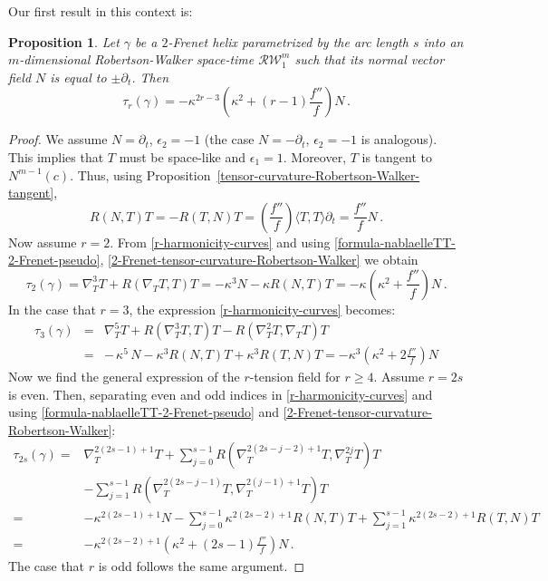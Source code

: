 \documentclass[11pt]{amsart}
\theoremstyle{plain}
\newtheorem{proposition}  [theorem]  {Proposition}
\theoremstyle{definition}
\numberwithin{equation}{section}
\begin{document}
Our first result in this context is:

\begin{proposition}\label{tension-field-Robertson-Walker-Npartial}
Let $\gamma$ be a $2$-Frenet helix parametrized by the arc length $s$ into an $m$-dimensional Robertson-Walker space-time $\mathcal{RW}^{m}_1$ such that its normal vector field $N$ is equal to $\pm \partial_t$. Then 
$$\tau_r(\gamma) = - \kappa^{2r -3} \left( \kappa^2 + (r - 1)\frac{f''}{f} \right)N\,.
$$
\end{proposition} 

\begin{proof}
We assume $N = \partial_t$, $\epsilon_2 = - 1$ (the case $N = -\partial_t$, $\epsilon_2 = - 1$ is analogous). This implies that $T$ must be space-like and $\epsilon_1 = 1$. Moreover, $T$ is tangent to $N^{m-1}(c)$. Thus, using Proposition~\ref{tensor-curvature-Robertson-Walker-tangent}, 
\begin{equation}\label{2-Frenet-tensor-curvature-Robertson-Walker}
R (N , T) T = -R (T , N) T = \left( \frac{f''}{f} \right) \langle T, T\rangle \partial_t = \frac{f''}{f} N \,. 
\end{equation}
Now assume $r=2$. From \eqref{r-harmonicity-curves} and using \eqref{formula-nablaelleTT-2-Frenet-pseudo}, \eqref{2-Frenet-tensor-curvature-Robertson-Walker} we obtain
\[
\tau_2(\gamma) = \nabla_T^3 T + R (\nabla_T T, T) T =  - \kappa^3 N - \kappa R(N, T) T =- \kappa \left(\kappa^2 + \frac{f''}{f} \right) N\,.
\]
In the case that $r=3$, the expression \eqref{r-harmonicity-curves} becomes:
\begin{eqnarray*}
\tau_3(\gamma) & = & \nabla^5_T T + R (\nabla^3_T T, T) T - R (\nabla^2_T T, \nabla_T T) T\\
& = &  - \, \kappa^5\,N - \kappa^3 R(N, T) T + \kappa^3 R (T, N) T= - \kappa^3 \left(\kappa^2 + 2\frac{f''}{f} \right) N
\end{eqnarray*}
Now we find the general expression of the $r$-tension field for $r \geq 4$. Assume $r=2s$ is even. Then, separating even and odd indices in \eqref{r-harmonicity-curves} and using \eqref{formula-nablaelleTT-2-Frenet-pseudo} and \eqref{2-Frenet-tensor-curvature-Robertson-Walker}:
\[
\begin{aligned}
\tau_{2s}(\gamma)   = &\nabla_T^{2(2s -1) +1} T + \sum_{j=0}^{s-1} R\left (\nabla_T^{2(2s - j -2) + 1} T ,\nabla_T^{2j} T\right )T\\
&- \sum_{j=1}^{s-1}R\left (\nabla_T^{2(2s - j - 1)} T ,\nabla_T^{2(j-1)+1} T\right) T\\
 = &- \kappa^{2(2s -1) +1}N - \sum_{j=0}^{s-1} \kappa^{2(2s - 2) + 1}R\left( N, T \right)T + \sum_{j=1}^{s-1}  \kappa^{2(2s - 2) + 1} R\left( T, N\right) T \\
=& - \kappa^{2(2s -2) + 1} \left( \kappa^2 + (2s - 1)\frac{f''}{f} \right)N\,.
\end{aligned}
\]
The case that $r$ is odd follows the same argument.
\end{proof}
\end{document}

